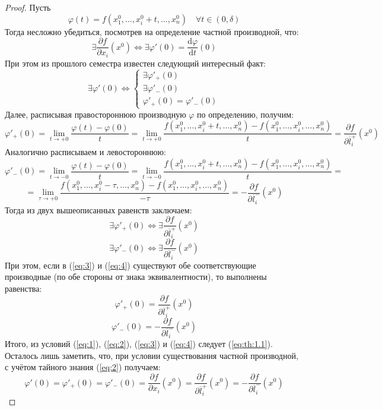 \documentclass[11pt]{article}
\begin{document}
\begin{proof}
    Пусть 
    \[\varphi(t) = f\left(x_1^0, \ldots, x_i^0 + t, \ldots, x_n^0\right) \quad \forall t \in (0, \delta)\]
    Тогда несложно убедиться, посмотрев на определение частной производной, что:
    \begin{equation} \label{eq:1}
        \exists \frac{\partial f}{\partial x_i} \left(x^0\right) \iff \exists \varphi'(0) = \frac{\mathrm{d} \varphi}{\mathrm{d} t} (0)
    \end{equation}
    При этом из прошлого семестра известен следующий интересный факт:
    \begin{equation} \label{eq:2}
        \exists \varphi'(0) \iff
        \begin{cases}
            \exists \varphi'_{+}(0) \\
            \exists \varphi'_{-}(0) \\
            \varphi'_{+}(0) = \varphi'_{-}(0)
        \end{cases}
    \end{equation}
    Далее, расписывая правостороннюю производную $\varphi$ по определению, получим:
    \[\varphi'_{+}(0) = \lim_{t \to +0} \frac{\varphi(t) - \varphi(0)}{t} = \lim_{t \to +0} \frac{f\left(x_1^0, \ldots, x_i^0 + t, \ldots, x_n^0\right) - f\left(x_1^0, \ldots, x_i^0, \ldots, x_n^0\right)}{t} = \frac{\partial f}{\partial \overline{l}_i^{+}} \left(x^0\right)\]
    Аналогично расписываем и левостороннюю:
    \[\varphi'_{-}(0) = \lim_{t \to -0} \frac{\varphi(t) - \varphi(0)}{t} = \lim_{t \to -0} \frac{f\left(x_1^0, \ldots, x_i^0 + t, \ldots, x_n^0\right) - f\left(x_1^0, \ldots, x_i^0, \ldots, x_n^0\right)}{t} = \]
    \[= \lim_{\tau  \to +0} \frac{f\left(x_1^0, \ldots, x_i^0 - \tau, \ldots, x_n^0\right) - f\left(x_1^0, \ldots, x_i^0, \ldots, x_n^0\right)}{-\tau} = - \frac{\partial f}{\partial \overline{l}_i^{-}} \left(x^0\right)\]
    Тогда из двух вышеописанных равенств заключаем:
    \begin{equation} \label{eq:3}
        \exists \varphi'_{+}(0) \iff \exists \frac{\partial f}{\partial \overline{l}_i^{+}} \left(x^0\right)
    \end{equation}
    \begin{equation} \label{eq:4}
        \exists \varphi'_{-}(0) \iff \exists \frac{\partial f}{\partial \overline{l}_i^{-}} \left(x^0\right)
    \end{equation}
    При этом, если в (\ref{eq:3}) и (\ref{eq:4}) существуют обе соответствующие производные (по обе стороны от знака эквивалентности), 
    то выполнены равенства:
    \[\varphi'_{+}(0) = \frac{\partial f}{\partial \overline{l}_i^{+}} \left(x^0\right)\]
    \[\varphi'_{-}(0) = - \frac{\partial f}{\partial \overline{l}_i^{-}} \left(x^0\right)\]
    Итого, из условий (\ref{eq:1}), (\ref{eq:2}), (\ref{eq:3}) и (\ref{eq:4}) следует (\ref{eq:th:1.1}).
    Осталось лишь заметить, что, при условии существования частной производной, с учётом тайного знания (\ref{eq:2}) получаем:
    \[\varphi'(0) = \varphi'_{+} (0) = \varphi'_{-} (0) = \frac{\partial f}{\partial x_i} \left(x^0\right) = \frac{\partial f}{\partial \overline{l}_i^{+}} \left(x^0\right) = - \frac{\partial f}{\partial \overline{l}_i^{-}} \left(x^0\right)\]
\end{proof}
\end{document}
